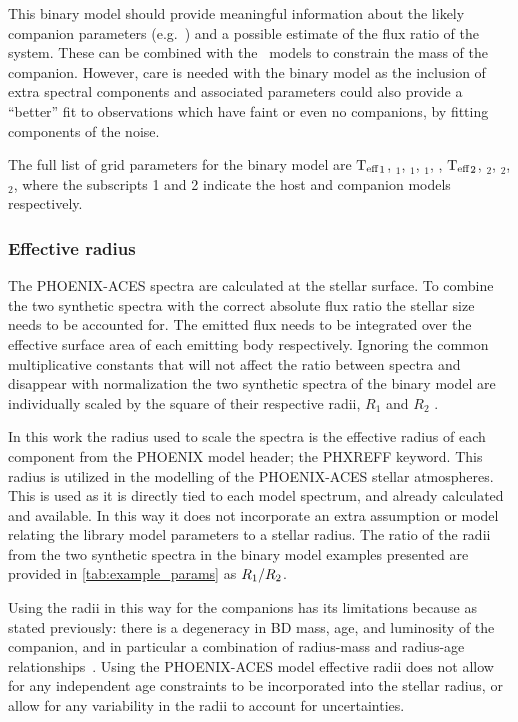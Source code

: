 This binary model should provide meaningful information about the likely companion parameters (e.g.\ \Teff{}) and a possible estimate of the flux ratio of the system.
These can be combined with the~\citet{baraffe_evolutionary_2003} models to constrain the mass of the companion.
However, care is needed with the binary model as the inclusion of extra spectral components and associated parameters could also provide a ``better'' fit to observations which have faint or even no companions, by fitting components of the noise.

The full list of grid parameters for the binary model are \({\textrm{T}_{\mathrm{eff}}}_{1}\), \logg{}\(_{1}\), \feh{}\(_{1}\), \alphafe{}\(_{1}\), \Rvone{}, \({\textrm{T}_{\mathrm{eff}}}_{2}\), \logg{}\(_{2}\), \feh{}\(_{2}\), \alphafe{}\(_{2}\), \Rvtwo{} where the subscripts 1 and 2 indicate the host and companion models respectively.


\subsubsection{Effective radius}
\label{subsection-radius}

The {PHOENIX-ACES} spectra are calculated at the stellar surface.
To combine the two synthetic spectra with the correct absolute flux ratio the stellar size needs to be accounted for.
The emitted flux needs to be integrated over the effective surface area of each emitting body respectively.
Ignoring the common multiplicative constants that will not affect the ratio between spectra and disappear with normalization the two synthetic spectra of the binary model are individually scaled by the square of their respective radii, \(R_{1}\) and \(R_{2}\) \Rone{}.

In this work the radius used to scale the spectra is the effective radius of each component from the {PHOENIX} model header; the {PHXREFF} keyword.
This radius is utilized in the modelling of the {PHOENIX-ACES} stellar atmospheres.
This is used as it is directly tied to each model spectrum, and already calculated and available.
In this way it does not incorporate an extra assumption or model relating the library model parameters to a stellar radius.
The ratio of the radii from the two synthetic spectra in the binary model examples presented are provided in \cref{tab:example_params} as \({R}_{1}/{R}_{2}\).

Using the radii in this way for the companions has its limitations because as stated previously: there is a degeneracy in {BD} mass, age, and luminosity of the companion, and in particular a combination of radius-mass and radius-age relationships~\citep{sorahana_radii_2013}.
Using the {PHOENIX-ACES} model effective radii does not allow for any independent age constraints to be incorporated into the stellar radius, or allow for any variability in the radii to account for uncertainties.

